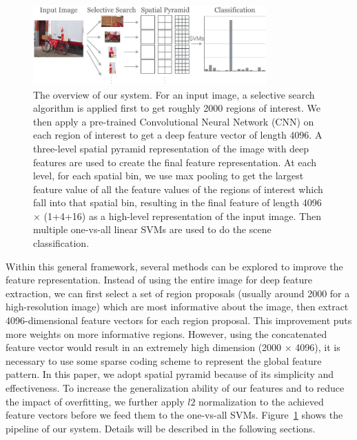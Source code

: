 \begin{figure}[ht]
  \centering
  \includegraphics[width=0.8\textwidth]{img/overview.pdf}
  \centering
  \caption{The overview of our system. For an input image, a selective search
  algorithm is applied first to get roughly 2000 regions of interest. We then
  apply a pre-trained Convolutional Neural Network (CNN) on each region of
  interest to get a deep feature vector of length 4096. A three-level spatial
  pyramid representation of the image with deep features are used to create the
  final feature representation. At each level, for each spatial bin, we use max
  pooling to get the largest feature value of all the feature values of the
  regions of interest which fall into that spatial bin, resulting in the final
  feature of length 4096 $\times$ (1+4+16) as a high-level
  representation of the input image. Then multiple one-vs-all linear SVMs are
  used to do the scene classification.} \label{fig:system_overview}
\end{figure}

Within this general framework, several methods can be explored to improve the
feature representation. Instead of using the entire image for deep feature
extraction, we can first select a set of region proposals (usually around 2000
for a high-resolution image) which are most informative about the image, then
extract 4096-dimensional feature vectors for each region proposal. This
improvement puts more weights on more informative regions. However, using the
concatenated feature vector would result in an extremely high dimension (2000
$\times$ 4096), it is necessary to use some sparse coding scheme to represent
the global feature pattern. In this paper, we adopt spatial pyramid because of
its simplicity and effectiveness. To increase the generalization ability of our
features and to reduce the impact of overfitting, we further apply $l2$
normalization to the achieved feature vectors before we feed them to the
one-vs-all SVMs. Figure~\ref{fig:system_overview} shows the pipeline of our
system. Details will be described in the following sections.

